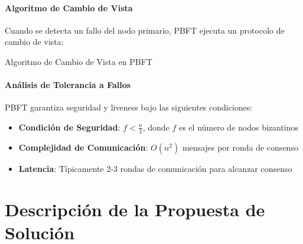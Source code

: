 \documentclass[spanish,12pt,letterpaper]{report}
\begin{document}
\subsubsection{Algoritmo de Cambio de Vista}

Cuando se detecta un fallo del nodo primario, PBFT ejecuta un protocolo de cambio de vista:

\begin{algorithm}[H]
\small
\SetAlgoLined
{}
\BlankLine
{}
\caption{Algoritmo de Cambio de Vista en PBFT}
\end{algorithm}

\subsubsection{Análisis de Tolerancia a Fallos}

PBFT garantiza seguridad y liveness bajo las siguientes condiciones:

\begin{itemize}
    \item \textbf{Condición de Seguridad}: $f < \frac{n}{3}$, donde $f$ es el número de nodos bizantinos
    \item \textbf{Complejidad de Comunicación}: $O(n^2)$ mensajes por ronda de consenso
    \item \textbf{Latencia}: Típicamente 2-3 rondas de comunicación para alcanzar consenso
\end{itemize}


\chapter{Descripción de la Propuesta de Solución}
\end{document}
